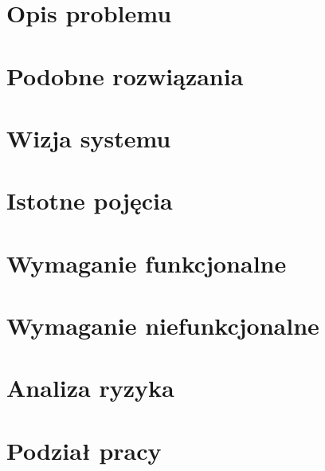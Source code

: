 \documentclass[../praca-dyplomowa.tex]{subfiles}
\begin{document}
\section{Opis problemu}


\section{Podobne rozwiązania}


\section{Wizja systemu}


\section{Istotne pojęcia}


\section{Wymaganie funkcjonalne}


\section{Wymaganie niefunkcjonalne}


\section{Analiza ryzyka}


\section{Podział pracy}

\end{document}
